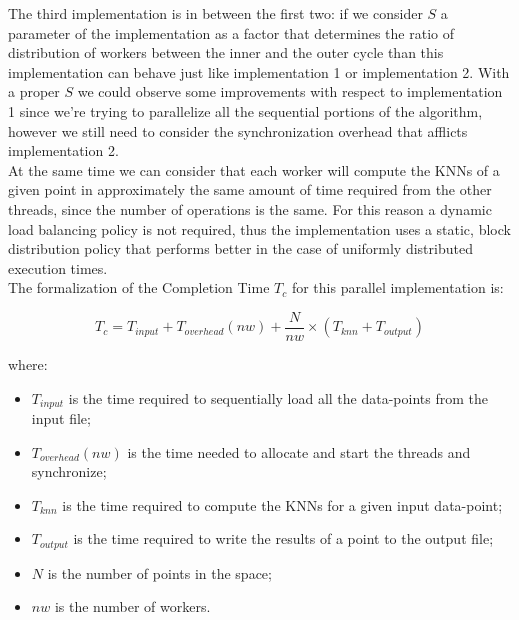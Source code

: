 \documentclass[12pt, letterpaper]{article}  %
\begin{document}
The third implementation is in between the first two: if we consider $S$ a parameter of the implementation as a factor that determines the ratio of distribution of workers between the inner and the outer cycle than this implementation can behave just like implementation 1 or implementation 2. With a proper $S$ we could observe some improvements with respect to implementation 1 since we're trying to parallelize all the sequential portions of the algorithm, however we still need to consider the synchronization overhead that afflicts implementation 2.\\
At the same time we can consider that each worker will compute the KNNs of a given point in approximately the same amount of time required from the other threads, since the number of operations is the same. For this reason a dynamic load balancing policy is not required, thus the implementation uses a static, block distribution policy that performs better in the case of uniformly distributed execution times.\\
The formalization of the Completion Time \textit{$T_c$} for this parallel implementation is:

\begin{equation}
    \textit{$T_{c}$} = \textit{$T_{input}$} + \textit{$T_{overhead}(nw)$} + \textit{$\frac{N}{nw}$} \times (\textit{$T_{knn}$} + \textit{$T_{output}$})
    \label{eq:parallel_tc}
\end{equation}

where:
\begin{itemize}
    \item \textit{$T_{input}$} is the time required to sequentially load all the data-points from the input file;
    \item \textit{$T_{overhead}(nw)$} is the time needed to allocate and start the threads and synchronize;
    \item \textit{$T_{knn}$} is the time required to compute the KNNs for a given input data-point;
    \item \textit{$T_{output}$} is the time required to write the results of a point to the output file;
    \item \textit{$N$} is the number of points in the space;
    \item \textit{$nw$} is the number of workers.
\end{itemize}
\end{document}

